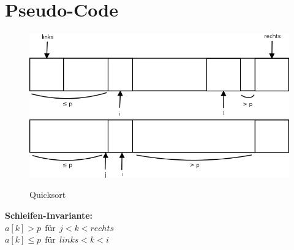 \section{Pseudo-Code}

\begin{figure}[H]
\centering
\includegraphics[width=0.7\linewidth]{06/Grafik/img1.png}
\includegraphics[width=0.7\linewidth]{06/Grafik/img2.png}
\caption{Quicksort}
\end{figure}

\textbf{Schleifen-Invariante:}\\
$a[k] > p~~\text{für}~~j <k<rechts$\\
$a[k] \leq p ~~\text{für}~~links<k<i$ 
\vspace{5pt}

